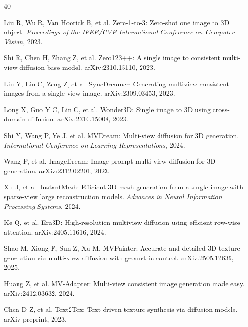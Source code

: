 \documentclass[times,twocolumn,final]{elsarticle}
\providecommand{\DIFdel}[1]{{\protect\color{red} \scriptsize #1}} %
\providecommand{\DIFaddbegin}{} %
\providecommand{\DIFaddend}{} %
\providecommand{\DIFdelbegin}{} %
\providecommand{\DIFdelend}{} %
\newcommand{\DIFscaledelfig}{0.5}
\newlength{\DIFdelgraphicswidth} %
\newlength{\DIFdelgraphicsheight} %
\newcommand{\DIFaddincludegraphics}[2][]{{\color{blue}\fbox{\DIFOincludegraphics[#1]{#2}}}} %
\newcommand{\DIFdelincludegraphics}[2][]{%
\sbox{\DIFdelgraphicsbox}{\DIFOincludegraphics[#1]{#2}}%
\settoboxwidth{\DIFdelgraphicswidth}{\DIFdelgraphicsbox} %
\settoboxtotalheight{\DIFdelgraphicsheight}{\DIFdelgraphicsbox} %
\scalebox{\DIFscaledelfig}{%
\parbox[b]{\DIFdelgraphicswidth}{\usebox{\DIFdelgraphicsbox}\\[-\baselineskip] \rule{\DIFdelgraphicswidth}{0em}}\llap{\resizebox{\DIFdelgraphicswidth}{\DIFdelgraphicsheight}{%
\setlength{\unitlength}{\DIFdelgraphicswidth}%
\begin{picture}(1,1)%
\thicklines\linethickness{2pt} %
{\color[rgb]{1,0,0}\put(0,0){\framebox(1,1){}}}%
{\color[rgb]{1,0,0}\put(0,0){\line( 1,1){1}}}%
{\color[rgb]{1,0,0}\put(0,1){\line(1,-1){1}}}%
\end{picture}%
}\hspace*{3pt}}} %
} %
\DeclareRobustCommand{\DIFaddbegin}{\DIFOaddbegin \let\includegraphics\DIFaddincludegraphics} %
\DeclareRobustCommand{\DIFaddend}{\DIFOaddend \let\includegraphics\DIFOincludegraphics} %
\DeclareRobustCommand{\DIFdelbegin}{\DIFOdelbegin \let\includegraphics\DIFdelincludegraphics} %
\DeclareRobustCommand{\DIFdelend}{\DIFOaddend \let\includegraphics\DIFOincludegraphics} %
\begin{document}
\DIFdelbegin %
\DIFdelend \DIFaddbegin \begin{thebibliography}{40}
\DIFaddend 


Liu R, Wu R, Van Hoorick B, et al. Zero-1-to-3: Zero-shot one image to 3D object. \textit{Proceedings of the IEEE/CVF International Conference on Computer Vision}, 2023.

Shi R, Chen H, Zhang Z, et al. Zero123++: A single image to consistent multi-view diffusion base model. arXiv:2310.15110, 2023.

Liu Y, Lin C, Zeng Z, et al. SyncDreamer: Generating multiview-consistent images from a single-view image. arXiv:2309.03453, 2023.

Long X, Guo Y C, Lin C, et al. Wonder3D: Single image to 3D using cross-domain diffusion. arXiv:2310.15008, 2023.

Shi Y, Wang P, Ye J, et al. MVDream: Multi-view diffusion for 3D generation. \textit{International Conference on Learning Representations}, 2024.

Wang P, et al. ImageDream: Image-prompt multi-view diffusion for 3D generation. arXiv:2312.02201, 2023.

Xu J, et al. InstantMesh: Efficient 3D mesh generation from a single image with sparse-view large reconstruction models. \textit{Advances in Neural Information Processing Systems}, 2024.

Ke Q, et al. Era3D: High-resolution multiview diffusion using efficient row-wise attention. arXiv:2405.11616, 2024.

\DIFdelbegin %
\DIFdel{Shao M, Xiong F, Sun Z, Xu M. MVPainter: Accurate and detailed 3D texture generation via multi-view diffusion with geometric control. arXiv:2505.12635, 2025.
}%

\DIFdel{Huang Z, et al. MV-Adapter: Multi-view consistent image generation made easy. arXiv:2412.03632, 2024.
}%

\DIFdelend {}
Chen D Z, et al. Text2Tex: Text-driven texture synthesis via diffusion models. arXiv preprint, 2023.


\end{thebibliography}
\end{document}
